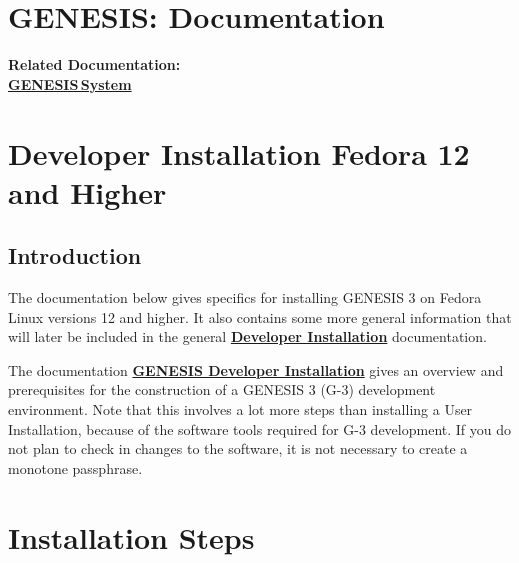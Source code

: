 \documentclass[12pt]{article}
\begin{document}
\section*{GENESIS: Documentation}

{\bf Related Documentation:} \\
\href{../genesis-system/genesis-system.tex}{\bf GENESIS\,System}

\section*{Developer Installation Fedora 12 and Higher}

\subsection*{Introduction}

The documentation below gives specifics for installing GENESIS 3 on Fedora
Linux versions 12 and higher. It also contains some more general
information that will later be included in the general 
\href {../developer-installation/developer-installation.html}{\bf
Developer Installation} documentation.

The documentation 
\href {../installation-developer/installation-developer.html}{\bf GENESIS
Developer Installation} gives an overview and prerequisites for the
construction of a GENESIS 3 (G-3) development environment. Note that this
involves a lot more steps than installing a User Installation, because of
the software tools required for G-3 development.  If you do not plan to
check in changes to the software, it is not necessary to create a monotone
passphrase.


\section*{Installation Steps}
\end{document}
